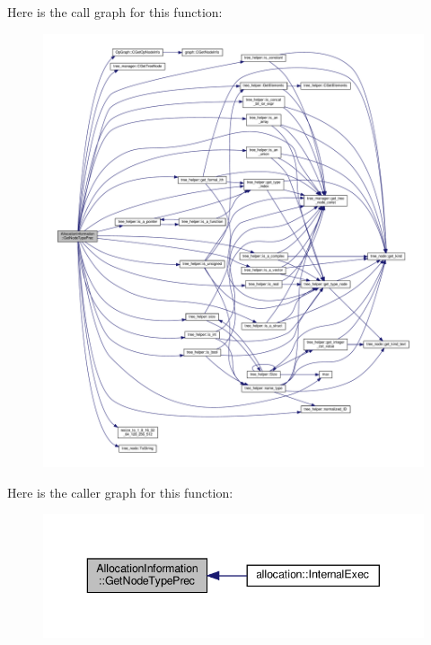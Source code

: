 Here is the call graph for this function\+:
\nopagebreak
\begin{figure}[H]
\begin{center}
\leavevmode
\includegraphics[width=350pt]{d7/d79/classAllocationInformation_a5abfaf6d87461a2bb2279e10b700f41f_cgraph}
\end{center}
\end{figure}
Here is the caller graph for this function\+:
\nopagebreak
\begin{figure}[H]
\begin{center}
\leavevmode
\includegraphics[width=343pt]{d7/d79/classAllocationInformation_a5abfaf6d87461a2bb2279e10b700f41f_icgraph}
\end{center}
\end{figure}
\mbox{\label{classAllocationInformation_a2f6e61eeb7824e2da224e7fcc183c523}} 
